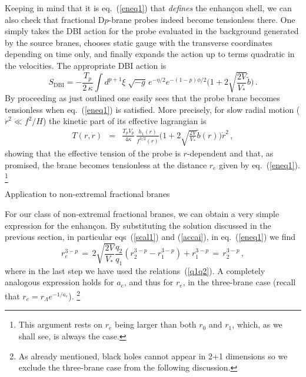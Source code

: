 \documentclass[a4paper,11pt]{article}
\makeatletter
\renewcommand{\subsection}{\@startsection{subsection}{2}{\z@} {-3.25ex
plus -1ex minus -.2ex}{1.5ex plus .2ex}{\normalsize\bf}}
\newcommand{\eqref}[1]{(\ref{#1})}
\makeatother
\begin{document}
Keeping in mind that it is eq.~\eqref{eneq1} that \emph{defines} the
enhan\c{c}on shell, we can also check that fractional D$p$-brane probes
indeed become tensionless there. One simply takes the DBI action for the
probe evaluated in the background generated by the source branes, chooses
static gauge with the transverse coordinates depending on time only, and
finally expands the action up to terms quadratic in the velocities. The
appropriate DBI action is
\begin{equation}
\label{dbi1}
S_{\mathrm{DBI}} = - \frac{T_p}{2\,\kappa} \int d^{p+1} \xi \;
\sqrt{-g}\, e^{-\eta/2} e^{- (1-p) \phi/2} \bigg( 1 + 2 \sqrt{\frac{2
V}{V_*}} \tilde b \bigg) \,.
\end{equation}
By proceeding as just outlined one easily sees that the probe brane becomes
tensionless when eq.~\eqref{eneq1} is satisfied. More precisely, for slow
radial motion ($\dot{r}^2\ll f^2/H$) the kinetic part of its effective
lagrangian is
\begin{eqnarray}
T(r,\dot r) &=& \frac{T_p V_p}{4\kappa}\,\frac{h_1(r)}{f^{3/2}(r)}
  \bigg(1 + 2\sqrt{\frac{2 V}{V_*}} \tilde{b}(r)\bigg) \dot{r}^2 \,,
\end{eqnarray}
showing that the effective tension of the probe is $r$-dependent and that,
as promised, the brane becomes tensionless at the distance $r_e$ given by
eq.~\eqref{eneq1}.%
\footnote{This argument rests on $r_e$ being larger than both
$r_0$ and $r_1$, which, as we shall see, is always the case.}



\subsection{Application to non-extremal fractional branes}

For our class of non-extremal fractional branes, we can obtain a very
simple expression for the enhan\c{c}on. By substituting the solution
discussed in the previous section, in particular eqs~\eqref{scal1} and
\eqref{accai}, in eq.~\eqref{eneq1} we find
\begin{equation}
\label{enhan1}
r_e^{3-p}\,=\, 2 \sqrt{\frac{2 V}{V_*}} \frac{q_2}{q_1}
\left(r_2^{3-p}- r_1^{3-p}\right)+ r_1^{3-p} \,= \,r_2^{3-p} \,,
\end{equation}
where in the last step we have used the relations~\eqref{q1q2}. A
completely analogous expression holds for $a_e$, and thus for $r_e$,
in the three-brane case (recall that $r_e=r_\Lambda e^{-1/a_e}$).%
\footnote{As already mentioned, black holes cannot appear in 2+1
dimensions  so we exclude the three-brane case from the following
discussion.}
\end{document}
